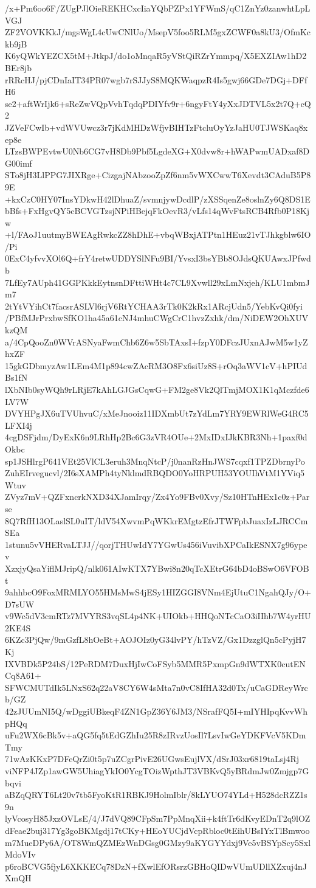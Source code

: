 /x+Pm6oo6F/ZUgPJlOieREKHCxcIiaYQbPZPx1YFWmS/qC1ZnYz0zanwhtLpLVGJ
ZF2VOVKKkJ/mgsWgL4cUwCNlUo/MsepV5foo5RLM5gxZCWF0a8kU3/OfmKckb9jB
K6yQWkYEZCX5tM+JtkpJ/do1oMnqaR5yVStQiRZrYmmpq/X5EXZIAw1hD2BEr8jb
rRRcHJ/pjCDnIaIT34PR07wgb7rSJJyS8MQKWaqpzR4Is5gwj66GDe7DGj+DFfH6
se2+aftWrIjk6+sReZwVQpVvhTqdqPDIYfv9r+6ngyFtY4yXxJDTVL5x2t7Q+cQ2
JZVeFCwIb+vdWVUwcz3r7jKdMHDzWfjvBIHTzFtcluOyYzJaHU0TJWSKaq8xep8e
LTzsBWPEvtwU0Nb6CG7vH8Db9Pbf5LgdeXG+X0dvw8r+hWAPwmUADxaf8DG00imf
STo8jH3LlPPG7JIXRge+CizgajNAbzooZpZf6nm5vWXCwwT6Xevdt3CAduB5P89E
+kxCzC0HY07InsYDkwH42lDhuaZ/svmnjywDcdlP/zXSSqenZe8oslnZy6Q8DS1E
bBfs+FxHgvQY5cBCVGTzsjNPiHBejqFkOevR3/vLfs14qWvFtsRCB4Rfb0P18Kjw
+l/FAoJ1uutmyBWEAgRwkcZZ8hDhE+vbqWBxjATPtn1HEuz21vTJhkgblw6IO/Pi
0ExC4yfvvXOl6Q+frY4retwUDDYSlNFu9BI/YvsxI3bsYBb8OJdsQKUAwxJPfwdb
7LfEy7AUph41GGPKkkEytnsnDFttiWHt4c7CL9Xvwll29xLmNxjeh/KLU1mbmJm7
2tYtVYihCt7facsrASLVl6rjV6RtYCHAA3rTk0K2kRx1ARcjUdn5/YebKvQi0fyi
/PBfMJrPrxbwSfKO1ha45a61cNJ4mhuCWgCrC1hvzZxhk/dm/NiDEW2OhXUVkzQM
a/4CpQooZn0WVrASNyaFwmChb6Z6w5SbTAxsI+fzpY0DFczJUxnAJwM5w1yZhxZF
15gkGDbmyzAw1LEm4M1p894cwZAcRM3O8Fx6siUz8S+rOq3aWV1cV+hPIUdBs1fN
lXbNIb0syWQh9rLRjE7kAhLGJGsCqwG+FM2ge8Vk2QlTmjMOX1K1qMczfde6LV7W
DVYHPgJX6uTVUhvuC/xMeJnooiz11IDXmbUt7zYdLm7YRY9EWRlWeG4RC5LFXI4j
4cgDSFjdm/DyExK6n9LRhHp2Bc6G3zVR4OUe+2MxIDxIJkKBR3Nh+1paxf0dOkbc
sp1JSHlrgP641VEt25VlCL3eruh3MnqNtcP/j0nanRzHnJWS7cqxf1TPZDbrnyPo
ZuhEIrvegucvl/2I6sXAMPh4tyNklmdRBQDO0YoHRPUH53YOUIhVtM1YViq5Wtuv
ZVyz7mV+QZFxncrkNXD34XJamIrqy/Zx4Yo9FBv0Xvy/Sz10HTnHEx1c0z+Parse
8Q7RfH13OLaslSL0uIT/ldV54XwvmPqWKkrEMgtzEfrJTWFpbJuaxIzLJRCCmSEa
1stunu5vVHERvaLTJJ//qorjTHUwIdY7YGwUs456iVuvibXPCaIkESNX7g96ypev
XzxjyQsaYiflMJripQ/nlk061AIwKTX7YBwi8n20qTcXEtrG64bD4oBSwO6VFOBt
9ahhbcO9FoxMRMLYO55HMsMwS4jESy1HIZGGI8VNm4EjUtuC1NgahQJy/O+D7sUW
v9Wc5dV3cmRTz7MVYRS3vqSL4p4NK+UIOkb+HHQoNTcCaO3iIIhb7W4yrHU2KE4S
6KZc3PjQw/9mGzfL8hOeBt+AOJOIz0yG34lvPY/hTzVZ/Gx1DzzglQn5cPyjH7Kj
IXVBDk5P24bS/12PeRDM7DuxHjIwCoFSyb5MMR5PxmpGn9dWTXK0cutENCq8A61+
SFWCMUTdIk5LNxS62q22aV8CY6W4sMta7n0vC8IfHA32d0Tx/uCaGDReyWrcb/GZ
42zJUUmNI5Q/wDggiUBkeqF4ZN1GpZ36Y6JM3/NSrafFQ5I+mIYHIpqKvvWhpHQq
uFu2WX6cBk5v+aQG5fq5tEdGZhIu25R8zIRvzUosIl7LsvIwGeYDKFVcV5KDmTmy
71wAzKKxP7DFeQrZi0t5p7uZCgrPivE26UGwsEujlVX/dSrJ03xr6819taLsj4Rj
viNFP4JZp1awGW5UhiagYkIO0YcgTOizWpthJT3VBKvQ5yBRdmJw0Zmjgp7Gbqvi
aBZqQRYT6Lt20v7tb5FyoKtR1RBKJ9HolmIblr/8kLYUO74YLd+H528dcRZZ1s9n
lyVcosyH85JxzOVLsE/4/J7dVQ89CFpSm7PpMnqXii+k4ftTr6dKvyEDnT2q9lOZ
dFeae2buj317Yg3goBKMgdj17tCKy+HEoYUCjdVcpRbloc0tEihUBsIYxTlBmwoo
m7MueDPy6A/OT8WmQZMEzWnDGsg0GMzy9aKYGYYdxj9Ve5vBSYpScy5SxlMdoVIv
p6roBCVG5fjyL6XKKECq78DzN+fXwlEfORsrzGBHoQIDwVUmUDllXZxuj4nJXmQH
